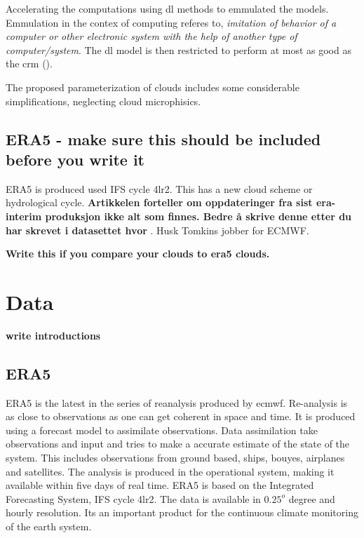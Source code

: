 Accelerating the computations using \acrshort{dl} methods to emmulated the models.  Emmulation in the contex of computing referes to, \textit{imitation of behavior of a computer or other electronic system with the help of another type of computer/system}. The \acrshort{dl} model is then restricted to perform at most as good as the \acrshort{crm} (\cite{Rasp2018DeepModels}).




The proposed parameterization of clouds includes some considerable simplifications, neglecting cloud microphisics. 


\subsection{ERA5 - make sure this should be included before you write it} \label{sec:param_ERA5}
ERA5 is produced used IFS cycle 4lr2. This has a new cloud scheme or hydrological cycle. \textbf{Artikkelen forteller om oppdateringer fra sist era-interim produksjon ikke alt som finnes. Bedre å skrive denne etter du har skrevet i datasettet hvor }. Husk Tomkins jobber for ECMWF.

\textbf{Write this if you compare your clouds to era5 clouds.}

\section{Data}
\textbf{write introductions}


\subsection{ERA5} \label{sec:era5}
ERA5 is the latest in the series of reanalysis produced by \acrfull{ecmwf}. Re-analysis is as close to observations as one can get coherent in space and time. It is produced using a forecast model to assimilate observations. Data assimilation take observations and input and tries to make a accurate estimate of the state of the system. This includes observations from ground based, ships, bouyes, airplanes and satellites. The analysis is produced in the operational system, making it available within five days of real time. ERA5 is based on the Integrated Forecasting System, IFS cycle 4lr2. The data is available in $0.25^o$ degree and hourly resolution. Its an important product for the continuous climate monitoring of the earth system. 

